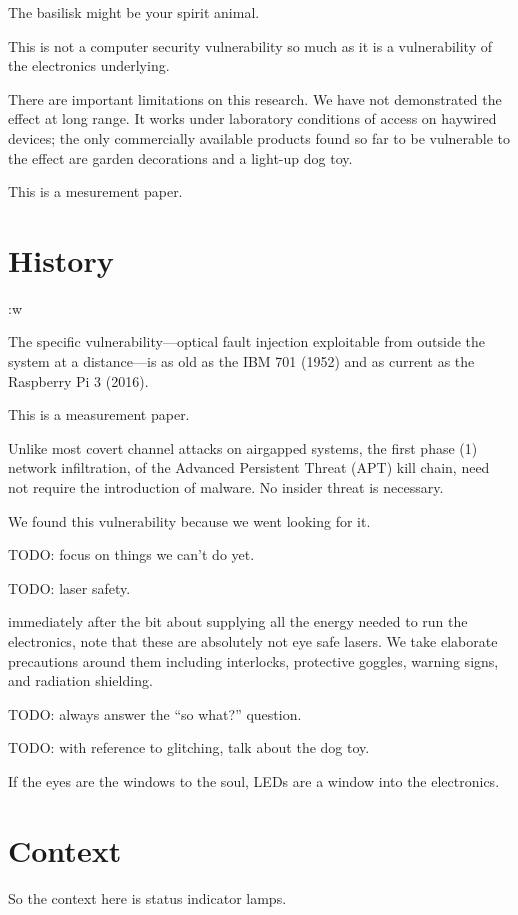 \documentclass[letterpaper]{article}
\begin{document}
The basilisk might be your spirit animal.

This is not a computer security vulnerability so much as it is a vulnerability
of the electronics underlying.

There are important limitations on this research. We have not demonstrated the
effect at long range. It works under laboratory conditions of access on
haywired devices; the only commercially available products found so far to be
vulnerable to the effect are garden decorations and a light-up dog toy.

This is a mesurement paper.

\section{History}:w

The specific vulnerability---optical fault injection exploitable from outside
the system at a distance---is as old as the IBM 701 (1952) and as current as
the Raspberry Pi 3 (2016).




This is a measurement paper.

Unlike most covert channel attacks on airgapped
systems, the first phase (1) network infiltration, of the Advanced Persistent
Threat (APT) kill chain, need not require the introduction of malware. No
insider threat is necessary.


We found this vulnerability because we went looking for it.

TODO: focus on things we can't do yet.

TODO: laser safety.

immediately after the bit
about supplying all the energy needed to run the electronics, note that these
are absolutely not eye safe lasers. We take elaborate precautions around them
including interlocks, protective goggles, warning signs, and radiation
shielding.

TODO: always answer the ``so what?'' question.

TODO: with reference to glitching, talk about the dog toy.

If the eyes are the windows to the soul, LEDs are a window into the electronics.

\section{Context}

So the context here is status indicator lamps.
\end{document}
